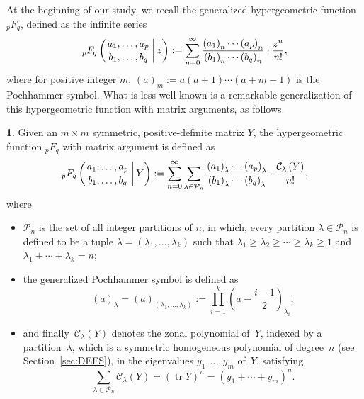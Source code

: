 \documentclass{mathincs}
\numberwithin{equation}{section}
\numberwithin{figure}{section}
\theoremstyle{plain}
\theoremstyle{definition}
\newtheorem{defn}[thm]{\protect\definitionname}
\theoremstyle{remark}
\theoremstyle{plain}
\theoremstyle{definition}
\theoremstyle{plain}
\theoremstyle{plain}
\DeclareMathOperator{\Tr}{tr}
\providecommand{\definitionname}{Definition}
\begin{document}
At the beginning of our study, we recall the generalized hypergeometric
function ${}_pF_q$, defined as the infinite series
\begin{equation}\label{eq:pFq}
  {}_pF_q\left(\genfrac{}{}{0pt}{}{a_{1},\ldots,a_{p}}{b_{1},\ldots,b_{q}}\,\bigg|\,z\right) :=
  \sum_{n=0}^{\infty}\frac{\left(a_{1}\right)_{n}\cdots\left(a_{p}\right)_{n}}{\left(b_{1}\right)_{n}\cdots\left(b_{q}\right)_{n}}\cdot\frac{z^{n}}{n!},
\end{equation}
where for positive integer $m$,
$\left(a\right)_{m}:=a\left(a+1\right)\cdots\left(a+m-1\right)$ is the
Pochhammer symbol.  What is less well-known is a remarkable generalization of
this hypergeometric function with matrix arguments, as follows.
\begin{defn}
Given an $m\times m$ symmetric, positive-definite matrix $Y$, the
hypergeometric function ${}_pF_q$ with matrix argument is defined as 
\begin{equation}\label{eq:MatrixpFq}
  {}_{p}F_{q}\left(\genfrac{}{}{0pt}{}{a_{1},\ldots,a_{p}}{b_{1},\ldots,b_{q}}\,\bigg|\,Y\right) :=
  \sum_{n=0}^{\infty}\sum_{\lambda\in\mathcal{P}_{n}}\frac{\left(a_{1}\right)_{\lambda}\cdots\left(a_{p}\right)_{\lambda}}
      {\left(b_{1}\right)_{\lambda}\cdots\left(b_{q}\right)_{\lambda}}\cdot\frac{\mathcal{C}_{\lambda}\left(Y\right)}{n!},
\end{equation}
where 
\begin{itemize}
\item $\mathcal{P}_{n}$ is the set of all integer partitions of $n$, in which,
every partition $\lambda\in\mathcal{P}_{n}$ is defined to be a tuple
$\lambda=\left(\lambda_{1},\ldots,\lambda_{k}\right)$ such that 
$\lambda_{1}\geq\lambda_{2}\geq\cdots\geq\lambda_{k}\geq 1$ and 
$ \lambda_{1}+\cdots+\lambda_{k}=n$;
\item the generalized Pochhammer symbol is defined as
\[
  \left(a\right)_{\lambda}=\left(a\right)_{\left(\lambda_{1},\dots,\lambda_{k}\right)}:=\prod_{i=1}^{k}\left(a-\frac{i-1}{2}\right)_{\!\!\lambda_{i}};
\]
\item and finally~$\mathcal{C}_{\lambda}(Y)$ denotes the zonal polynomial
of~$Y$, indexed by a partition~$\lambda$, which is a symmetric homogeneous polynomial
of degree~$n$ (see Section~\ref{sec:DEFS}), in the eigenvalues
$y_{1},\ldots,y_{m}$ of~$Y$, satisfying 
\begin{equation}\label{eq:TrZonal}
  \sum_{\lambda\in\mathcal{P}_{n}}\mathcal{C}_{\lambda}\left(Y\right)=\left(\Tr Y\right)^{n}=\left(y_{1}+\cdots+y_{m}\right)^{n}.
\end{equation}
\end{itemize}
\end{defn}
\end{document}
